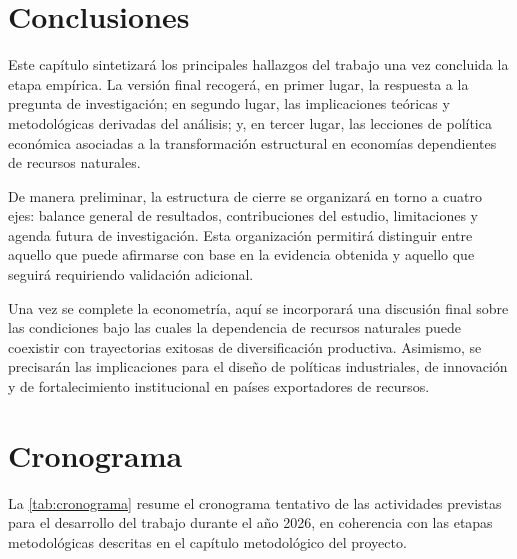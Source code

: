 \documentclass[../../PTFM.tex]{subfiles}
\begin{document}
	
	\chapter{Conclusiones}
	\label{chap:conclusiones}
	

	Este capítulo sintetizará los principales hallazgos del trabajo una vez concluida la etapa empírica. La versión final recogerá, en primer lugar, la respuesta a la pregunta de investigación; en segundo lugar, las implicaciones teóricas y metodológicas derivadas del análisis; y, en tercer lugar, las lecciones de política económica asociadas a la transformación estructural en economías dependientes de recursos naturales.

	De manera preliminar, la estructura de cierre se organizará en torno a cuatro ejes: balance general de resultados, contribuciones del estudio, limitaciones y agenda futura de investigación. Esta organización permitirá distinguir entre aquello que puede afirmarse con base en la evidencia obtenida y aquello que seguirá requiriendo validación adicional.

	Una vez se complete la econometría, aquí se incorporará una discusión final sobre las condiciones bajo las cuales la dependencia de recursos naturales puede coexistir con trayectorias exitosas de diversificación productiva. Asimismo, se precisarán las implicaciones para el diseño de políticas industriales, de innovación y de fortalecimiento institucional en países exportadores de recursos.
	
	
	
	
	
	\chapter*{Cronograma}
	\label{chap:planificacion}
	
	La \autoref{tab:cronograma} resume el cronograma tentativo de las actividades previstas para el desarrollo del trabajo durante el año 2026, en coherencia con las etapas metodológicas descritas en el capítulo metodológico del proyecto.
	
\end{document}
